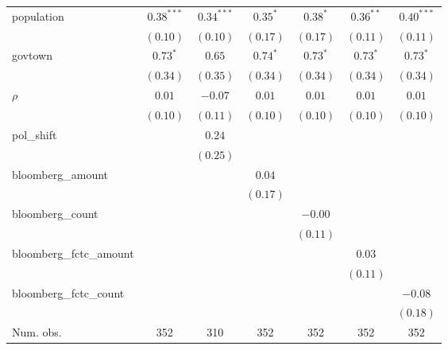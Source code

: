 \begin{table}[!h]
\begin{center}
\begin{tabular}{l c c c c c c }
population              & $0.38^{***}$ & $0.34^{***}$ & $0.35^{*}$   & $0.38^{*}$   & $0.36^{**}$  & $0.40^{***}$ \\
                        & $(0.10)$     & $(0.10)$     & $(0.17)$     & $(0.17)$     & $(0.11)$     & $(0.11)$     \\
govtown                 & $0.73^{*}$   & $0.65$       & $0.74^{*}$   & $0.73^{*}$   & $0.73^{*}$   & $0.73^{*}$   \\
                        & $(0.34)$     & $(0.35)$     & $(0.34)$     & $(0.34)$     & $(0.34)$     & $(0.34)$     \\
$\rho$                  & $0.01$       & $-0.07$      & $0.01$       & $0.01$       & $0.01$       & $0.01$       \\
                        & $(0.10)$     & $(0.11)$     & $(0.10)$     & $(0.10)$     & $(0.10)$     & $(0.10)$     \\
pol\_shift              &              & $0.24$       &              &              &              &              \\
                        &              & $(0.25)$     &              &              &              &              \\
bloomberg\_amount       &              &              & $0.04$       &              &              &              \\
                        &              &              & $(0.17)$     &              &              &              \\
bloomberg\_count        &              &              &              & $-0.00$      &              &              \\
                        &              &              &              & $(0.11)$     &              &              \\
bloomberg\_fctc\_amount &              &              &              &              & $0.03$       &              \\
                        &              &              &              &              & $(0.11)$     &              \\
bloomberg\_fctc\_count  &              &              &              &              &              & $-0.08$      \\
                        &              &              &              &              &              & $(0.18)$     \\
\midrule
Num. obs.               & 352          & 310          & 352          & 352          & 352          & 352          \\

\end{tabular}
\end{center}
\end{table}
